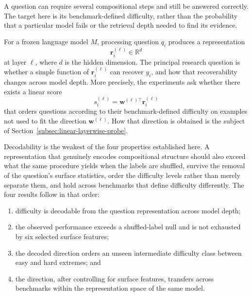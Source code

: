 A question can require several compositional steps and still be answered
correctly. The target here is its benchmark-defined difficulty, rather than
the probability that a particular model fails or the retrieval depth needed
to find its evidence.

For a frozen language model \(M\), processing question \(q_i\) produces a
representation
\begin{equation}
  \mathbf{r}^{(\ell)}_i\in\mathbb{R}^{d}
  \label{eq:probing-question-representation}
\end{equation}
at layer \(\ell\), where \(d\) is the hidden dimension. The principal research
question is whether a simple function of \(\mathbf{r}^{(\ell)}_i\) can recover
\(y_i\), and how that recoverability changes across model depth. More precisely,
the experiments ask whether there exists a linear score
\begin{equation}
  s_i^{(\ell)}=\mathbf{w}^{(\ell)\top}\mathbf{r}^{(\ell)}_i
  \label{eq:linear-difficulty-score}
\end{equation}
that orders questions according to their benchmark-defined difficulty on
examples not used to fit the direction \(\mathbf{w}^{(\ell)}\). How that
direction is obtained is the subject of
Section~\ref{subsec:linear-layerwise-probe}.

Decodability is the weakest of the four properties established here. A
representation that genuinely encodes compositional structure should also
exceed what the same procedure yields when the labels are shuffled, survive the
removal of the question's surface statistics, order the difficulty levels
rather than merely separate them, and hold across benchmarks that define
difficulty differently. The four results follow in that order:

\begin{enumerate}
  \item difficulty is decodable from the question representation across model
        depth;
  \item the observed performance exceeds a shuffled-label null and is not
        exhausted by six selected surface features;
  \item the decoded direction orders an unseen intermediate difficulty class
        between easy and hard extremes; and
  \item the direction, after controlling for surface features, transfers
        across benchmarks within the representation space of the same model.
\end{enumerate}

